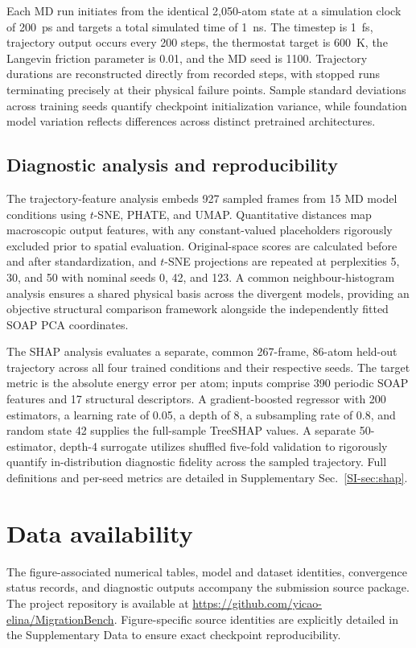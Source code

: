 \documentclass[pdflatex,sn-mathphys-num]{sn-jnl}
\newif\ifreviewcopy
\newcommand{\rev}[2]{\ifreviewcopy{\color{revisionblue}#2\textsuperscript{\scriptsize[R1-#1]}}\else#2\fi}
\begin{document}
\rev{C9}{Each MD run initiates from the identical 2,050-atom state at a simulation clock of 200~ps and targets a total simulated time of 1~ns.} The timestep is 1~fs, trajectory output occurs every 200 steps, the thermostat target is 600~K, the Langevin friction parameter is 0.01, and the MD seed is 1100. Trajectory durations are reconstructed directly from recorded steps, with stopped runs terminating precisely at their physical failure points. Sample standard deviations across training seeds quantify checkpoint initialization variance, while foundation model variation reflects differences across distinct pretrained architectures. 

\subsection{Diagnostic analysis and reproducibility}\label{sec:diagnostics}
The trajectory-feature analysis embeds 927 sampled frames from 15 MD model conditions using $t$-SNE, PHATE, and UMAP. \rev{C12}{Quantitative distances map macroscopic output features, with any constant-valued placeholders rigorously excluded prior to spatial evaluation.} Original-space scores are calculated before and after standardization, and $t$-SNE projections are repeated at perplexities 5, 30, and 50 with nominal seeds 0, 42, and 123. A common neighbour-histogram analysis ensures a shared physical basis across the divergent models, providing an objective structural comparison framework alongside the independently fitted SOAP PCA coordinates.

The SHAP analysis evaluates a separate, common 267-frame, 86-atom held-out trajectory across all four trained conditions and their respective seeds. The target metric is the absolute energy error per atom; inputs comprise 390 periodic SOAP features and 17 structural descriptors. A gradient-boosted regressor with 200 estimators, a learning rate of 0.05, a depth of 8, a subsampling rate of 0.8, and random state 42 supplies the full-sample TreeSHAP values. A separate 50-estimator, depth-4 surrogate utilizes shuffled five-fold validation to rigorously quantify in-distribution diagnostic fidelity across the sampled trajectory. Full definitions and per-seed metrics are detailed in Supplementary Sec.~\ref{SI-sec:shap}.

\section*{Data availability}
The figure-associated numerical tables, model and dataset identities, convergence status records, and diagnostic outputs accompany the submission source package. The project repository is available at \url{https://github.com/yicao-elina/MigrationBench}. Figure-specific source identities are explicitly detailed in the Supplementary Data to ensure exact checkpoint reproducibility.
\end{document}
